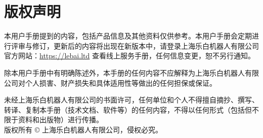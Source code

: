 \chapter*{版权声明}

本用户手册提到的内容，包括产品信息及其他资料仅供参考。本用户手册会定期进行评审与修订，更新后的内容将出现在新版本中，请登录上海乐白机器人有限公司官方网站：\url{https://lebai.ltd} 查看线上服务手册，任何信息变更，恕不另行通知。

除本用户手册中有明确陈述外，本手册的任何内容不应解释为上海乐白机器人有限公司对个人损害、财产损失和具体适用性等做出的任何担保或保证。 

未经上海乐白机器人有限公司的书面许可，任何单位和个人不得擅自摘抄、撰写、转译、复制本手册（技术文档、软件等）的任何内容，不得以任何形式（包括但不限于资料和出版物）进行传播。\\

版权所有 © 上海乐白机器人有限公司，侵权必究。 
